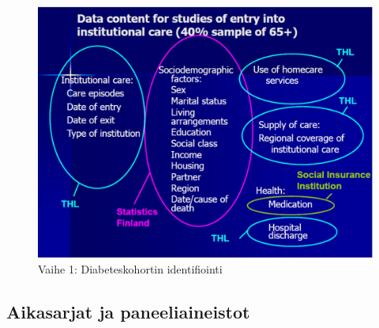 \documentclass[
]{book}
\begin{document}
\FloatBarrier

\begin{figure}

{\centering \includegraphics[width=1\linewidth]{images/rekist} 

}

\caption{Vaihe 1: Diabeteskohortin identifiointi}\label{fig:rekist}
\end{figure}

\FloatBarrier

\hypertarget{aikasarjat-ja-paneeliaineistot}{%
\subsection{Aikasarjat ja paneeliaineistot}\label{aikasarjat-ja-paneeliaineistot}}
\end{document}
